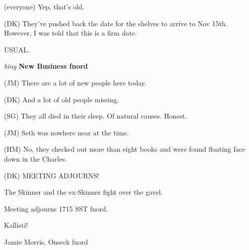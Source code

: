 (everyone) Yep, that's old.

(DK) They've pushed back the date for the shelves to arrive
to Nov 15th.  However, I was told that this is a firm date.

USUAL.

\vspace{0.15in}
{\em bing\/} {\bf New Business fnord\/}

(JM) There are a lot of new people here today.

(DK) And a lot of old people missing.

(SG) They all died in their sleep.  Of natural causes.  Honest.

(JM) Seth was nowhere near at the time.

(HM) No, they checked out more than eight books and were found floating
face down in the Charles.

(DK) MEETING ADJOURNS!

The Skinner and the ex-Skinner fight over the gavel.

Meeting adjourns 1715 SST fnord.

\vspace{0.15in}
\begin{center}
Kallisti!

Jamie Morris, Onseck fnord
\end{center}

